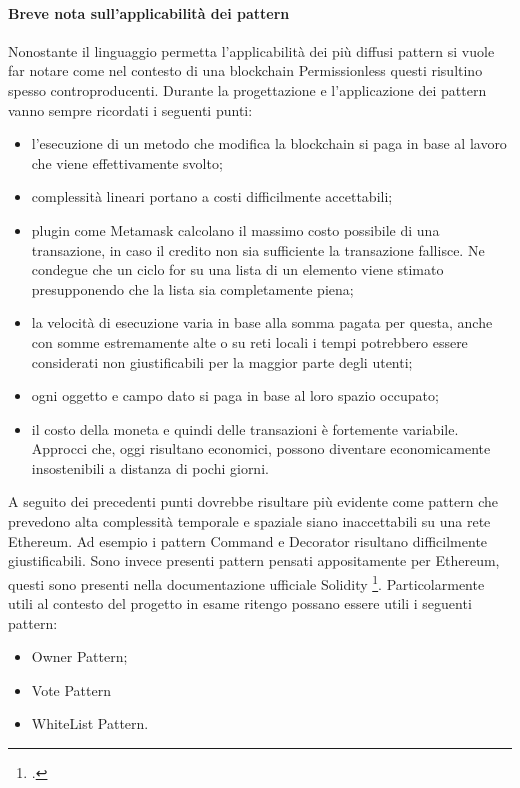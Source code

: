 \paragraph{Breve nota sull'applicabilità dei pattern}
Nonostante il linguaggio permetta l’applicabilità dei più diffusi pattern si vuole far notare come nel contesto di una blockchain Permissionless questi risultino spesso controproducenti. 
Durante la progettazione e l’applicazione dei pattern vanno sempre ricordati i seguenti punti:
\begin{itemize}
    \item l’esecuzione di un metodo che modifica la blockchain si paga in base al lavoro che viene effettivamente svolto;
    \item complessità lineari portano a costi difficilmente accettabili;
    \item plugin come Metamask calcolano il massimo costo possibile di una transazione, in caso il credito non sia sufficiente la transazione fallisce. Ne condegue che un ciclo for su una lista di un elemento viene stimato presupponendo che la lista sia completamente piena;
    \item la velocità di esecuzione varia in base alla somma pagata per questa, anche con somme estremamente alte o su reti locali i tempi potrebbero essere considerati non giustificabili per la maggior parte degli utenti;
    \item ogni oggetto e campo dato si paga in base al loro spazio occupato;
    \item il costo della moneta e quindi delle transazioni è fortemente variabile. Approcci che, oggi risultano economici, possono diventare economicamente insostenibili a distanza di pochi giorni.
\end{itemize}
A seguito dei precedenti punti dovrebbe risultare più evidente come pattern che prevedono alta complessità temporale e spaziale siano inaccettabili su una rete Ethereum. Ad esempio i pattern Command e Decorator risultano difficilmente giustificabili.
Sono invece presenti pattern pensati appositamente per Ethereum, questi sono presenti nella documentazione ufficiale Solidity \footcite{site:solidity-documentation}. Particolarmente utili al contesto del progetto in esame ritengo possano essere utili i seguenti pattern: 
\begin{itemize}
    \item Owner Pattern;
    \item Vote Pattern 
    \item WhiteList Pattern.
\end{itemize}

